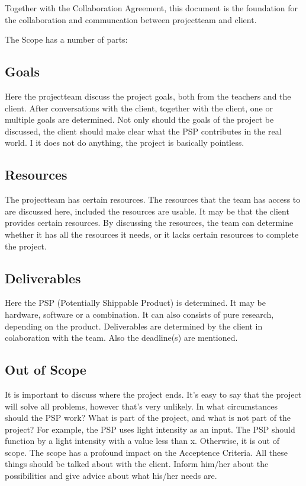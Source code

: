 \documentclass[10pt]{report}
\begin{document}
Together with the Collaboration Agreement, this document is the foundation for the collaboration and communcation between projectteam and client.

\bigskip

The Scope has a number of parts:

\subsection{Goals}

Here the projectteam discuss the project goals, both from the teachers and the client. After conversations with the client, together with the client, one or multiple goals are determined. Not only should the goals of the project be discussed, the client should make clear what the PSP contributes in the real world. I it does not do anything, the project is basically pointless.

\subsection{Resources}

The projectteam has certain resources. The resources that the team has access to are discussed here, included the resources are usable. It may be that the client provides certain resources. By discussing the resources, the team can determine whether it has all the resources it needs, or it lacks certain resources to complete the project.

\subsection{Deliverables}

Here the PSP (Potentially Shippable Product) is determined. It may be hardware, software or a combination. It can also consists of pure research, depending on the product. Deliverables are determined by the client in colaboration with the team. Also the deadline(s) are mentioned.

\subsection{Out of Scope}

It is important to discuss where the project ends. It's easy to say that the project will solve all problems, however that's very unlikely. In what circumstances should the PSP work? What is part of the project, and what is not part of the project? For example, the PSP uses light intensity as an input. The PSP should function by a light intensity with a value less than x. Otherwise, it is out of scope. The scope has a profound impact on the Acceptence Criteria. All these things should be talked about with the client. Inform him/her about the possibilities and give advice about what his/her needs are.
\end{document}

